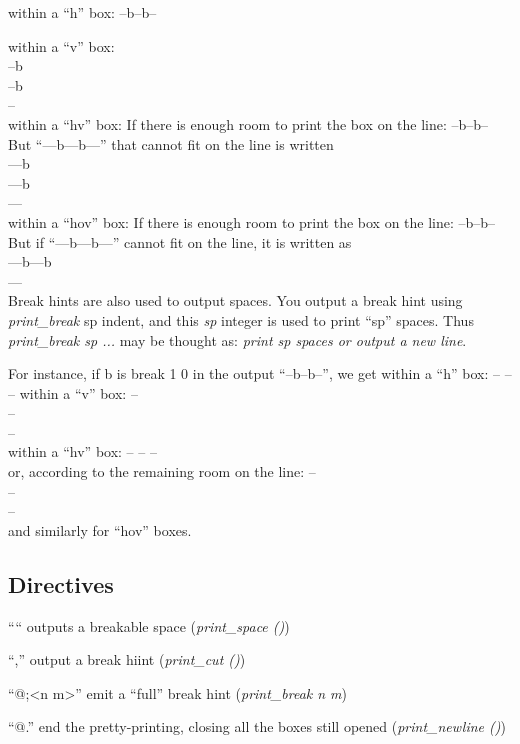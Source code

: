 within a ``h'' box: --b--b--

within a ``v'' box: \\
--b \\
--b \\
--   \\
   
within a ``hv'' box: If there is enough room to print the box on the
line: --b--b--
But ``---b---b---'' that cannot fit on the line is written \\
---b \\
---b \\
--- \\

within a ``hov'' box:
If there is enough room to print the box on the line:
   --b--b--
But if ``---b---b---'' cannot fit on the line, it is written as \\
   ---b---b \\
   --- \\

Break hints are also used to output spaces. You output a break hint
using \textit{print\_break} sp indent, and this \textit{sp} integer is used to print
``sp'' spaces. Thus \textit{print\_break sp ... }may be thought as: \textit{print sp
  spaces or output a new line}.


For instance, if b is break 1 0 in the output ``--b--b--'', we get
within a ``h'' box:
   -- -- --
within a ``v'' box:
   -- \\
   -- \\
   -- \\
within a ``hv'' box:
   -- -- -- \\
or, according to the remaining room on the line:
   -- \\ 
   -- \\ 
   -- \\ 
and similarly for ``hov'' boxes.

\subsection{Directives}
\label{sec:directives}

``\@ `` outputs a breakable space (\textit{print\_space ()})

``\@,''  output a break hiint (\textit{print\_cut ()})

``@;<n m>'' emit a ``full'' break hint (\textit{print\_break n m})

``@.'' end the pretty-printing, closing all the boxes still opened
(\textit{print\_newline ()})

